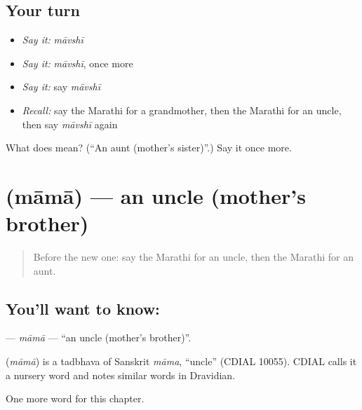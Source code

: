 \subsection*{Your turn}
\begin{itemize}
\raggedright
  \item \emph{Say it:} \emph{māvshī}
  \item \emph{Say it:} \emph{māvshī}, once more
  \item \emph{Say it:} say \emph{māvshī}
  \item \emph{Recall:} say the Marathi for a grandmother, then the Marathi for an uncle, then say \emph{māvshī} again
\end{itemize}

\begin{tcolorbox}[breakable,colback=teal!4,colframe=teal!35!black,title={Before you move on}]
What does  mean? (\textquotedblleft{}An aunt (mother's sister)\textquotedblright{}.) Say it once more.
\end{tcolorbox}
\section[\texorpdfstring{\mr{मामा} (māmā)}{मामा (māmā)}]{ (māmā) — an uncle (mother's brother)}

\label{lesson:MR-C75-mama}



\begin{quote}
Before the new one: say the Marathi for an uncle, then the Marathi for an aunt.
\end{quote}

\subsection*{You'll want to know: }
\textbf{} — \emph{māmā} — \textquotedblleft{}an uncle (mother's brother)\textquotedblright{}.

\begin{cousinweb}
\textbf{} (\emph{māmā}) is a tadbhava of Sanskrit \emph{māma}, \textquotedblleft{}uncle\textquotedblright{} (CDIAL 10055). CDIAL calls it a nursery word and notes similar words in Dravidian.
\end{cousinweb}

\begin{grammarlens}[title={What you've built}]
One more word for this chapter.
\end{grammarlens}

